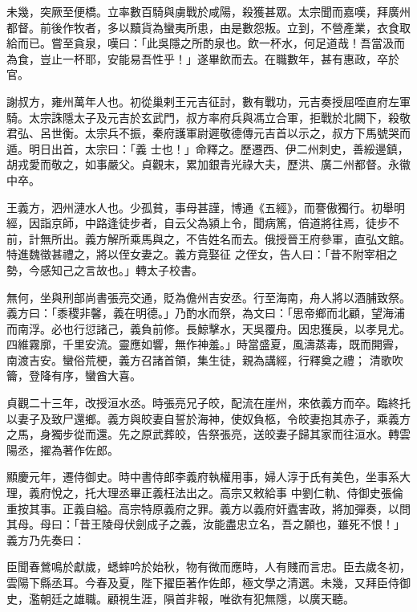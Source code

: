 \begin{pinyinscope}
 未幾，突厥至便橋。立率數百騎與虜戰於咸陽，殺獲甚眾。太宗聞而嘉嘆，拜廣州都督。前後作牧者，多以黷貨為蠻夷所患，由是數怨叛。立到，不營產業，衣食取
 給而已。嘗至貪泉，嘆曰：「此吳隱之所酌泉也。飲一杯水，何足道哉！吾當汲而為食，豈止一杯耶，安能易吾性乎！」遂畢飲而去。在職數年，甚有惠政，卒於官。



 謝叔方，雍州萬年人也。初從巢剌王元吉征討，數有戰功，元吉奏授屈咥直府左軍騎。太宗誅隱太子及元吉於玄武門，叔方率府兵與馮立合軍，拒戰於北闕下，殺敬君弘、呂世衡。太宗兵不振，秦府護軍尉遲敬德傳元吉首以示之，叔方下馬號哭而遁。明日出首，太宗曰：「義
 士也！」命釋之。歷遷西、伊二州刺史，善綏邊鎮，胡戎愛而敬之，如事嚴父。貞觀末，累加銀青光祿大夫，歷洪、廣二州都督。永徽中卒。



 王義方，泗州漣水人也。少孤貧，事母甚謹，博通《五經》，而謇傲獨行。初舉明經，因詣京師，中路逢徒步者，自云父為潁上令，聞病篤，倍道將往焉，徒步不前，計無所出。義方解所乘馬與之，不告姓名而去。俄授晉王府參軍，直弘文館。特進魏徵甚禮之，將以侄女妻之。義方竟娶征
 之侄女，告人曰：「昔不附宰相之勢，今感知己之言故也。」轉太子校書。



 無何，坐與刑部尚書張亮交通，貶為儋州吉安丞。行至海南，舟人將以酒脯致祭。義方曰：「黍稷非馨，義在明德。」乃酌水而祭，為文曰：「思帝鄉而北顧，望海浦而南浮。必也行愆諸己，義負前修。長鯨擊水，天吳覆舟。因忠獲戾，以孝見尤。四維霧廓，千里安流。靈應如響，無作神羞。」時當盛夏，風濤蒸毒，既而開霽，南渡吉安。蠻俗荒梗，義方召諸首領，集生徒，親為講經，行釋奠之禮；
 清歌吹籥，登降有序，蠻酋大喜。



 貞觀二十三年，改授洹水丞。時張亮兄子皎，配流在崖州，來依義方而卒。臨終托以妻子及致尸還鄉。義方與皎妻自誓於海神，使奴負柩，令皎妻抱其赤子，乘義方之馬，身獨步從而還。先之原武葬皎，告祭張亮，送皎妻子歸其家而往洹水。轉雲陽丞，擢為著作佐郎。



 顯慶元年，遷侍御史。時中書侍郎李義府執權用事，婦人淳于氏有美色，坐事系大理，義府悅之，托大理丞畢正義枉法出之。高宗又敕給事
 中劉仁軌、侍御史張倫重按其事。正義自縊。高宗特原義府之罪。義方以義府奸蠹害政，將加彈奏，以問其母。母曰：「昔王陵母伏劍成子之義，汝能盡忠立名，吾之願也，雖死不恨！」義方乃先奏曰：



 臣聞春鶯鳴於獻歲，蟋蟀吟於始秋，物有微而應時，人有賤而言忠。臣去歲冬初，雲陽下縣丞耳。今春及夏，陛下擢臣著作佐郎，極文學之清選。未幾，又拜臣侍御史，濫朝廷之雄職。顧視生涯，隕首非報，唯欲有犯無隱，以廣天聽。




\end{pinyinscope}
